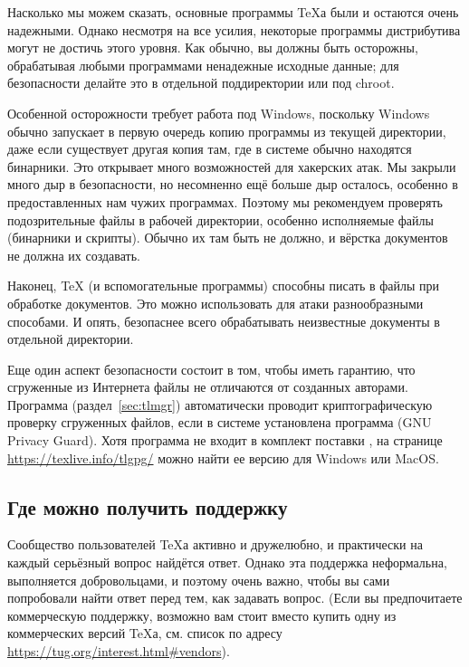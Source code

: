 \documentclass{article}
\begin{document}
Насколько мы можем сказать, основные программы \TeX{}а были и остаются
очень надежными.  Однако несмотря на все усилия, некоторые программы
дистрибутива могут не достичь этого уровня.  Как обычно, вы должны
быть осторожны, обрабатывая любыми программами ненадежные исходные
данные;  для безопасности делайте это в отдельной поддиректории или
под chroot.

Особенной осторожности требует работа под Windows, поскольку Windows
обычно запускает в первую очередь копию программы из текущей
директории, даже если существует другая копия там, где в системе
обычно находятся бинарники.  Это открывает много возможностей для
хакерских атак.  Мы закрыли много дыр в безопасности, но несомненно
ещё больше дыр осталось, особенно в предоставленных нам чужих
программах.  Поэтому мы рекомендуем проверять подозрительные файлы в
рабочей директории, особенно исполняемые файлы (бинарники и
скрипты).  Обычно их там быть не должно, и вёрстка документов не
должна их создавать.

Наконец, \TeX{} (и вспомогательные программы) способны писать в файлы
при обработке документов.  Это можно использовать для атаки
разнообразными способами.  И опять, безопаснее всего обрабатывать
неизвестные документы в отдельной директории.

Еще один аспект безопасности состоит в том, чтобы иметь гарантию, что
сгруженные из Интернета файлы не отличаются от созданных авторами.
Программа  (раздел~\ref{sec:tlmgr}) автоматически проводит
криптографическую проверку сгруженных файлов, если в системе
установлена программа  (GNU Privacy Guard).  Хотя программа
 не входит в комплект поставки \TL, на странице
\url{https://texlive.info/tlgpg/} можно найти ее версию для Windows
или MacOS.  

\subsection{Где можно получить поддержку}
\label{sec:help}

Сообщество пользователей \TeX{}а активно и дружелюбно, и практически
на каждый серьёзный вопрос найдётся ответ. Однако эта поддержка
неформальна, выполняется добровольцами, и поэтому очень важно, чтобы
вы сами попробовали найти ответ перед тем, как задавать вопрос.  (Если
вы предпочитаете коммерческую поддержку, возможно вам стоит вместо
\TL{} купить одну из коммерческих версий \TeX{}а, см. список по
адресу \url{https://tug.org/interest.html#vendors}).
\end{document}
